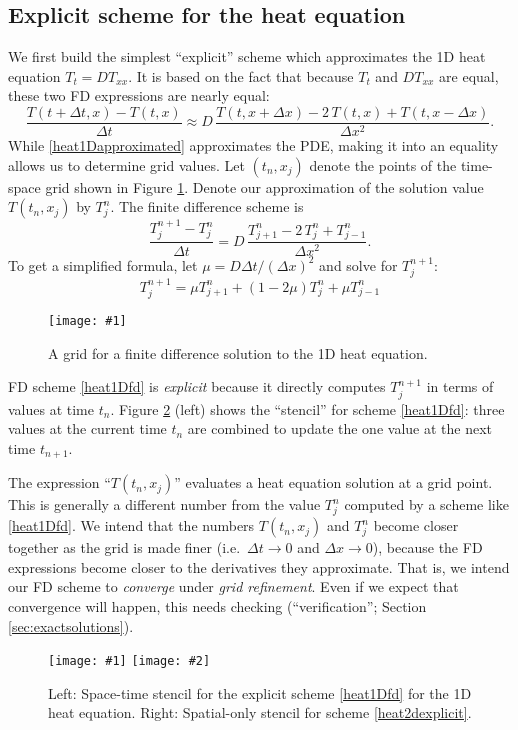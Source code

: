 \documentclass[letterpaper,final,12pt,reqno]{amsart}
\newcommand{\onefigsize}[3]{
\begin{figure}[ht]
\centering
\texttt{[image: \#1]}
\caption{#2}
\label{fig:#1}
\end{figure}}
\newcommand{\twofigsizes}[5]{
\begin{figure}[ht]
\centering
\texttt{[image: \#1]} \quad
\texttt{[image: \#2]}
\caption{#3}
\label{fig:#1}
\end{figure}}
\begin{document}
\subsection*{Explicit scheme for the heat equation}  We first build the simplest ``explicit'' scheme which approximates the 1D heat equation $T_t=D T_{xx}$.  It is based on the fact that because $T_t$ and $D T_{xx}$ are equal, these two FD expressions are nearly equal:
\begin{equation}
\frac{T(t+\Delta t,x) - T(t,x)}{\Delta t} \approx D\,\frac{T(t,x+\Delta x) - 2\, T(t,x) + T(t,x-\Delta x)}{\Delta x^2}.  \label{heat1Dapproximated}
\end{equation}
While \eqref{heat1Dapproximated} approximates the PDE, making it into an equality allows us to determine grid values.  Let $(t_n,x_j)$ denote the points of the time-space grid shown in Figure \ref{fig:timespacegrid}.  Denote our approximation of the solution value $T(t_n,x_j)$ by $T_j^n$.  The finite difference scheme is
	$$\frac{T_j^{n+1} - T_j^n}{\Delta t} = D\,\frac{T_{j+1}^n - 2\, T_j^n + T_{j-1}^n}{\Delta x^2}.$$
To get a simplified formula, let $\mu = D \Delta t / (\Delta x)^2$ and solve for $T_j^{n+1}$:
\begin{equation}
  T_j^{n+1} = \mu T_{j+1}^n + (1 - 2 \mu) T_j^n + \mu T_{j-1}^n \label{heat1Dfd}
\end{equation}

\onefigsize{timespacegrid}{A grid for a finite difference solution to the 1D heat equation.}{2.0in}

FD scheme \eqref{heat1Dfd} is \emph{explicit} because it directly computes $T_j^{n+1}$ in terms of values at time $t_n$.  Figure \ref{fig:expstencil} (left) shows the ``stencil'' for scheme \eqref{heat1Dfd}: three values at the current time $t_n$ are combined to update the one value at the next time $t_{n+1}$.

The expression ``$T(t_n,x_j)$'' evaluates a heat equation solution at a grid point.  This is generally a different number from the value $T_j^n$ computed by a scheme like \eqref{heat1Dfd}.  We intend that the numbers $T(t_n,x_j)$ and $T_j^n$ become closer together as the grid is made finer (i.e.~$\Delta t \to 0$ and $\Delta x \to 0$), because the FD expressions become closer to the derivatives they approximate.  That is, we intend our FD scheme to \emph{converge} under \emph{grid refinement}.  Even if we expect that convergence will happen, this needs checking (``verification''; Section \ref{sec:exactsolutions}).

\twofigsizes{expstencil}{exp2dstencil}{Left: Space-time stencil for the explicit scheme \eqref{heat1Dfd} for the 1D heat equation.  Right: Spatial-only stencil for scheme \eqref{heat2dexplicit}.}{2.0in}{2.1in}
\end{document}
